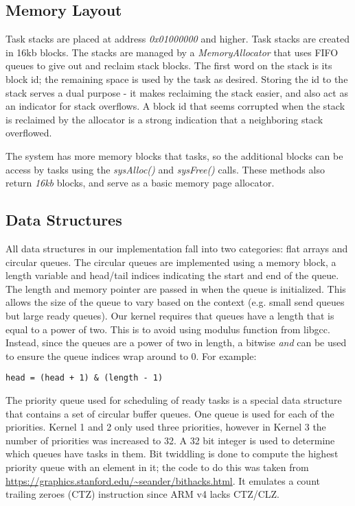 \documentclass[twoside,a4paper]{refart}
\begin{document}
\subsection{Memory Layout}
Task stacks are placed at address \textit{0x01000000} and higher. Task stacks are created in 16kb blocks. The stacks are managed by a \textit{MemoryAllocator} that uses FIFO queues to give out and reclaim stack blocks. The first word on the stack is its block id; the remaining space is used by the task as desired. Storing the id to the stack serves a dual purpose - it makes reclaiming the stack easier, and also act as an indicator for stack overflows. A block id that seems corrupted when the stack is reclaimed by the allocator is a strong indication that a neighboring stack overflowed.

The system has more memory blocks that tasks, so the additional blocks can be access by tasks using the \textit{sysAlloc()} and \textit{sysFree()} calls. These methods also return \textit{16kb} blocks, and serve as a basic memory page allocator.

\subsection{Data Structures}
All data structures in our implementation fall into two categories: flat arrays and circular queues. The circular queues are implemented using a memory block, a length variable and head/tail indices indicating the start and end of the queue. The length and memory pointer are passed in when the queue is initialized. This allows the size of the queue to vary based on the context (e.g. small send queues but large ready queues). Our kernel requires that queues have a length that is equal to a power of two. This is to avoid using modulus function from libgcc. Instead, since the queues are a power of two in length, a bitwise \textit{and} can be used to ensure the queue indices wrap around to 0. For example:

\begin{verbatim}
head = (head + 1) & (length - 1)
\end{verbatim}

The priority queue used for scheduling of ready tasks is a special data structure that contains a set of circular buffer queues. One queue is used for each of the priorities. Kernel 1 and 2 only used three priorities, however in Kernel 3 the number of priorities was increased to 32. A 32 bit integer is used to determine which queues have tasks in them. Bit twiddling is done to compute the highest priority queue with an element in it; the code to do this was taken from \url{https://graphics.stanford.edu/~seander/bithacks.html}. It emulates a count trailing zeroes (CTZ) instruction since ARM v4 lacks CTZ/CLZ.
\end{document}

